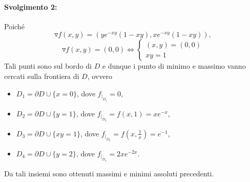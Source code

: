 \begin{example}
	\paragraph{Svolgimento 2:} Poiché
	\begin{equation*}
		\triangledown f(x,y) = (ye^{-xy}(1-xy), xe^{-xy}(1-xy)),
	\end{equation*}
	\begin{equation*}
		\triangledown f(x,y) = (0,0) \iff
		\begin{cases}
			(x,y)=(0,0)\\
			xy=1
		\end{cases}
	\end{equation*}
	Tali punti sono sul bordo di $D$ e dunque i punto di minimo e massimo vanno cercati sulla frontiera di $D$, ovvero
	\begin{itemize}
		\item $D_1=\partial D\cup\{x=0\}$, dove $f_{|_{D_1}}=0$,
		\item $D_2=\partial D\cup\{y=1\}$, dove $f_{|_{D_2}}=f(x,1)=xe^{-x}$,
		\item $D_3=\partial D\cup\{xy=1\}$, dove $f_{|_{D_3}}=f(x,\frac{1}{x})=e^{-1}$,
		\item $D_4=\partial D\cup\{y=2\}$, dove $f_{|_{D_4}}=2xe^{-2x}$.
	\end{itemize}
	Da tali insiemi sono ottenuti massimi e minimi assoluti precedenti.
\end{example}

